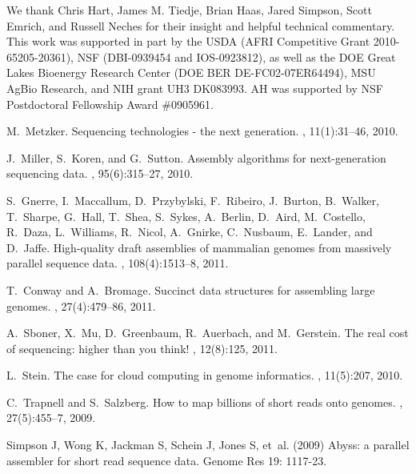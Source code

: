 \documentclass{pnastwo}
\begin{document}
\begin{article}
\begin{acknowledgments}
We thank Chris Hart, James M. Tiedje, Brian Haas, Jared Simpson, Scott
Emrich, and Russell Neches for their insight and helpful technical
commentary.  This work was supported in part by the USDA (AFRI
Competitive Grant 2010-65205-20361), NSF (DBI-0939454 and
IOS-0923812), as well as the DOE Great Lakes Bioenergy Research Center
(DOE BER DE-FC02-07ER64494), MSU AgBio Research, and NIH grant UH3
DK083993.  AH was supported by NSF Postdoctoral Fellowship Award
\#0905961.

\end{acknowledgments}

%
%

\begin{thebibliography}{20}

M.~Metzker.
\newblock Sequencing technologies - the next generation.
, 11(1):31--46, 2010.

J.~Miller, S.~Koren, and G.~Sutton.
\newblock Assembly algorithms for next-generation sequencing data.
, 95(6):315--27, 2010.

S.~Gnerre, I.~Maccallum, D.~Przybylski, F.~Ribeiro, J.~Burton, B.~Walker,
  T.~Sharpe, G.~Hall, T.~Shea, S.~Sykes, A.~Berlin, D.~Aird, M.~Costello,
  R.~Daza, L.~Williams, R.~Nicol, A.~Gnirke, C.~Nusbaum, E.~Lander, and
  D.~Jaffe.
\newblock High-quality draft assemblies of mammalian genomes from massively
  parallel sequence data.
, 108(4):1513--8, 2011.

T.~Conway and A.~Bromage.
\newblock Succinct data structures for assembling large genomes.
, 27(4):479--86, 2011.

A.~Sboner, X.~Mu, D.~Greenbaum, R.~Auerbach, and M.~Gerstein.
\newblock The real cost of sequencing: higher than you think!
, 12(8):125, 2011.

L.~Stein.
\newblock The case for cloud computing in genome informatics.
, 11(5):207, 2010.

C.~Trapnell and S.~Salzberg.
\newblock How to map billions of short reads onto genomes.
, 27(5):455--7, 2009.

Simpson J, Wong K, Jackman S, Schein J, Jones S, et~al. (2009)
\newblock Abyss: a parallel assembler for short read sequence data.
\newblock Genome Res 19: 1117-23.


\end{thebibliography}
\end{article}
\end{document}
